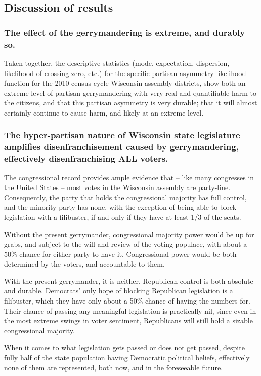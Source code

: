 \documentclass[preprint,12pt]{article}
\begin{document}
\subsection{Discussion of results}
\subsubsection{The effect of the gerrymandering is extreme, and durably so.}
 
Taken together, the descriptive statistics (mode, expectation, dispersion, likelihood of crossing zero, etc.) for the specific partisan asymmetry likelihood function for the 2010-census cycle Wisconsin assembly districts, show both an extreme level of partisan gerrymandering with very real and quantifiable harm to the citizens, and that this partisan asymmetry is very durable; that it will almost certainly continue to cause harm, and likely at an extreme level.
 
\subsubsection{The hyper-partisan nature of Wisconsin state legislature amplifies disenfranchisement caused by gerrymandering, effectively disenfranchising ALL voters.}
 
The congressional record provides ample evidence that -- like many congresses in the United States -- most votes in the Wisconsin assembly are party-line.  Consequently, the party that holds the congressional majority has full control, and the minority party has none, with the exception of being able to block legislation with a filibuster, if and only if they have at least 1/3 of the seats.
 
Without the present gerrymander, congressional majority power would be up for grabs, and subject to the will and review of the voting populace, with about a 50\% chance for either party to have it.  Congressional power would be both determined by the voters, and accountable to them.
 
With the present gerrymander, it is neither.  Republican control is both absolute and durable.  Democrats' only hope of blocking Republican legislation is a filibuster, which they have only about a 50\% chance of having the numbers for.  Their chance of passing any meaningful legislation is practically nil, since even in the most extreme swings in voter sentiment, Republicans will still hold a sizable congressional majority.
 
When it comes to what legislation gets passed or does not get passed, despite fully half of the state population having Democratic political beliefs, effectively none of them are represented, both now, and in the foreseeable future.  
 
\end{document}
